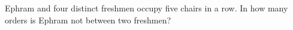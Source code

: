 Ephram and four distinct freshmen occupy five chairs in a row. In how many orders is Ephram not between two freshmen?
